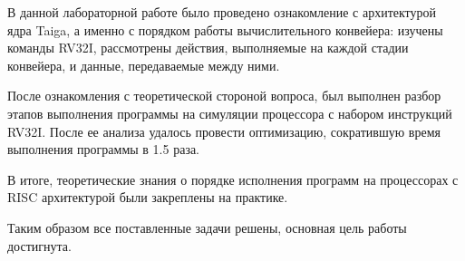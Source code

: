 
В данной лабораторной работе было проведено ознакомление с архитектурой ядра Taiga, а именно с порядком работы вычислительного конвейера: изучены команды RV32I, рассмотрены действия, выполняемые на каждой стадии конвейера, и данные, передаваемые между ними.

После ознакомления с теоретической стороной вопроса, был выполнен разбор этапов выполнения программы на симуляции процессора с набором инструкций RV32I. После ее анализа удалось провести оптимизацию, сократившую время выполнения программы в 1.5 раза.

В итоге, теоретические знания о порядке исполнения программ на процессорах с RISC архитектурой были закреплены на практике.

Таким образом все поставленные задачи решены, основная цель работы достигнута.